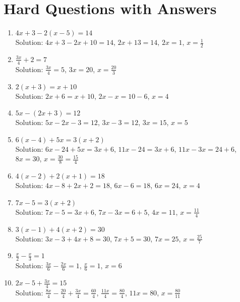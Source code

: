 \documentclass{article}
\begin{document}
\section*{Hard Questions with Answers}
\begin{enumerate}
    \item \( 4x + 3 - 2(x - 5) = 14 \) \\
          Solution: \( 4x + 3 - 2x + 10 = 14 \), \( 2x + 13 = 14 \), \( 2x = 1 \), \( x = \frac{1}{2} \)
    \item \( \frac{3x}{4} + 2 = 7 \) \\
          Solution: \( \frac{3x}{4} = 5 \), \( 3x = 20 \), \( x = \frac{20}{3} \)
    \item \( 2(x + 3) = x + 10 \) \\
          Solution: \( 2x + 6 = x + 10 \), \( 2x - x = 10 - 6 \), \( x = 4 \)
    \item \( 5x - (2x + 3) = 12 \) \\
          Solution: \( 5x - 2x - 3 = 12 \), \( 3x - 3 = 12 \), \( 3x = 15 \), \( x = 5 \)
    \item \( 6(x - 4) + 5x = 3(x + 2) \) \\
          Solution: \( 6x - 24 + 5x = 3x + 6 \), \( 11x - 24 = 3x + 6 \), \( 11x - 3x = 24 + 6 \), \( 8x = 30 \), \( x = \frac{30}{8} = \frac{15}{4} \)
    \item \( 4(x - 2) + 2(x + 1) = 18 \) \\
          Solution: \( 4x - 8 + 2x + 2 = 18 \), \( 6x - 6 = 18 \), \( 6x = 24 \), \( x = 4 \)
    \item \( 7x - 5 = 3(x + 2) \) \\
          Solution: \( 7x - 5 = 3x + 6 \), \( 7x - 3x = 6 + 5 \), \( 4x = 11 \), \( x = \frac{11}{4} \)
    \item \( 3(x - 1) + 4(x + 2) = 30 \) \\
          Solution: \( 3x - 3 + 4x + 8 = 30 \), \( 7x + 5 = 30 \), \( 7x = 25 \), \( x = \frac{25}{7} \)
    \item \( \frac{x}{2} - \frac{x}{3} = 1 \) \\
          Solution: \( \frac{3x}{6} - \frac{2x}{6} = 1 \), \( \frac{x}{6} = 1 \), \( x = 6 \)
    \item \( 2x - 5 + \frac{3x}{4} = 15 \) \\
          Solution: \( \frac{8x}{4} - \frac{20}{4} + \frac{3x}{4} = \frac{60}{4} \), \( \frac{11x}{4} = \frac{80}{4} \), \( 11x = 80 \), \( x = \frac{80}{11} \)
\end{enumerate}
\end{document}
